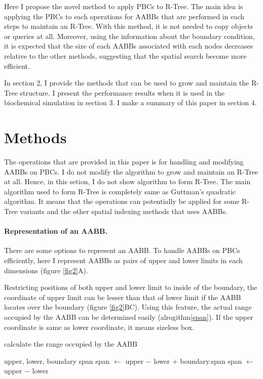 \documentclass[10pt,letterpaper,twocolumn]{article}
\begin{document}
Here I propose the novel method to apply PBCs to R-Tree. The main idea is
applying the PBCs to each operations for AABBs that are performed in each steps to
maintain an R-Tree. With this method, it is not needed to copy objects or
queries at all. Moreover, using the information about the boundary condition,
it is expected that the size of each AABBs associated with each nodes decreases
relative to the other methods, suggesting that the spatial search become more
efficient.

In section 2, I provide the methods that can be used to grow and maintain the
R-Tree structure. I present the performance results when it is used in the
biochemical simulation in section 3. I make a summary of this paper in section 4.

\section*{Methods}

The operations that are provided in this paper is for handling and modifying
AABBs on PBCs. I do not modify the algorithm to grow and maintain an R-Tree at all.
Hence, in this setion, I do not show algorithm to form R-Tree. The main algorithm
used to form R-Tree is completely same as Guttman's quadratic algorithm.
It means that the operations can potentially be applied for some R-Tree variants
and the other spatial indexing methods that uses AABBs.

\paragraph{Representation of an AABB.}
There are some options to represent an AABB. To handle AABBs on PBCs efficiently,
here I represent AABBs as pairs of upper and lower limits in each dimensions
(figure \ref{fig2}A).

Restricting positions of both upper and lower limit to inside of the boundary,
the coordinate of upper limit can be lesser than that of lower limit if the AABB
locates over the boundary (figure \ref{fig2}BC). Using this feature, the actual
range occupied by the AABB can be determined easily (alrogithm\ref{span}).
If the upper coordinate is same as lower coordinate, it means sizeless box.

\begin{algorithm}
    \caption{calculate the range occupied by the AABB}
    \label{span}
    \begin{algorithmic}
        \Require upper, lower, boundary
        \Ensure  span
            \State span $\gets$ upper $-$ lower $+$ boundary.span
        \Else
            \State span $\gets$ upper $-$ lower
        \EndIf
    \end{algorithmic}
\end{algorithm}
\end{document}
